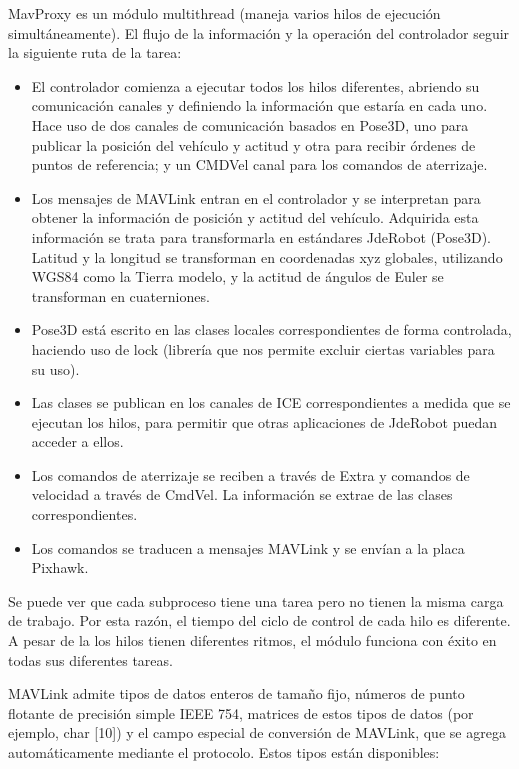 MavProxy es un módulo multithread (maneja varios hilos de ejecución simultáneamente). El flujo de la información y la operación del controlador seguir la siguiente ruta de la tarea:

\begin{itemize}
\item El controlador comienza a ejecutar todos los hilos diferentes, abriendo su comunicación canales y definiendo la información que estaría en cada uno. Hace uso de dos canales de comunicación basados en Pose3D, uno para publicar la posición del vehículo y actitud y otra para recibir órdenes de puntos de referencia; y un CMDVel canal para los comandos de aterrizaje.
\item Los mensajes de MAVLink entran en el controlador y se interpretan para obtener la información de posición y actitud del vehículo. Adquirida esta  información se trata para transformarla en estándares JdeRobot (Pose3D). Latitud y la longitud se transforman en coordenadas xyz globales, utilizando WGS84 como la Tierra modelo, y la actitud de ángulos de Euler se transforman en cuaterniones.
\item Pose3D está escrito en las clases locales correspondientes de forma controlada, haciendo uso de lock (librería que nos permite excluir ciertas variables para su uso).
\item Las clases se publican en los canales de ICE correspondientes a medida que se ejecutan los hilos, para permitir que otras aplicaciones de JdeRobot puedan acceder a ellos.
\item Los comandos de aterrizaje se reciben a través de Extra y comandos de velocidad a través de CmdVel. La información se extrae de las clases correspondientes.
\item Los comandos se traducen a mensajes MAVLink y se envían a la placa Pixhawk.
\end{itemize}

Se puede ver que cada subproceso tiene una tarea pero no tienen la misma carga de trabajo.
Por esta razón, el tiempo del ciclo de control de cada hilo es diferente. A pesar de la los hilos tienen diferentes ritmos, el módulo funciona con éxito en todas sus diferentes tareas.

MAVLink admite tipos de datos enteros de tamaño fijo, números de punto flotante de precisión simple IEEE 754, matrices de estos tipos de datos (por ejemplo, char [10]) y el campo especial de conversión de MAVLink, que se agrega automáticamente mediante el protocolo. Estos tipos están disponibles:

